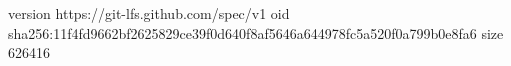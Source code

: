 version https://git-lfs.github.com/spec/v1
oid sha256:11f4fd9662bf2625829ce39f0d640f8af5646a644978fc5a520f0a799b0e8fa6
size 626416
